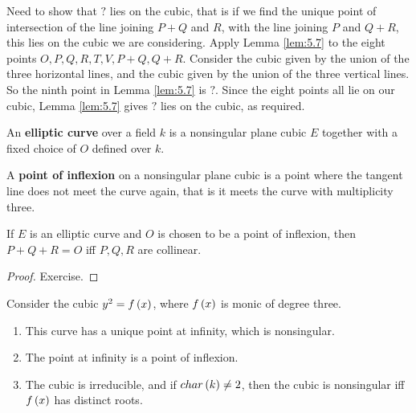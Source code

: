 Need to show that $ ? $ lies on the cubic, that is if we find the unique point of intersection of the line joining $ P + Q $ and $ R $, with the line joining $ P $ and $ Q + R $, this lies on the cubic we are considering. Apply Lemma \ref{lem:5.7} to the eight points $ O, P, Q, R, T, V, P + Q, Q + R $. Consider the cubic given by the union of the three horizontal lines, and the cubic given by the union of the three vertical lines. So the ninth point in Lemma \ref{lem:5.7} is $ ? $. Since the eight points all lie on our cubic, Lemma \ref{lem:5.7} gives $ ? $ lies on the cubic, as required.

\begin{definition}
An \textbf{elliptic curve} over a field $ k $ is a nonsingular plane cubic $ E $ together with a fixed choice of $ O $ defined over $ k $.
\end{definition}

\begin{definition}
A \textbf{point of inflexion} on a nonsingular plane cubic is a point where the tangent line does not meet the curve again, that is it meets the curve with multiplicity three.
\end{definition}

\begin{lemma}
\label{lem:5.10}
If $ E $ is an elliptic curve and $ O $ is chosen to be a point of inflexion, then $ P + Q + R = O $ iff $ P, Q, R $ are collinear.
\end{lemma}

\begin{proof}
Exercise.
\end{proof}

\pagebreak

\begin{lemma}
Consider the cubic $ y^2 = f\left( x \right) $, where $ f\left( x \right) $ is monic of degree three.
\begin{enumerate}
\item This curve has a unique point at infinity, which is nonsingular.
\item The point at infinity is a point of inflexion.
\item The cubic is irreducible, and if $ char\left( k \right) \ne 2 $, then the cubic is nonsingular iff $ f\left( x \right) $ has distinct roots.
\end{enumerate}
\end{lemma}


